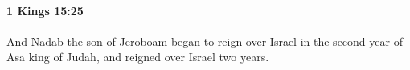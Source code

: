 
		\paragraph{1 Kings 15:25} %
			\label{1KINGS-15-25}

			And Nadab the son of Jeroboam began to reign over Israel in the second year of Asa king of Judah, and reigned over Israel two years.


